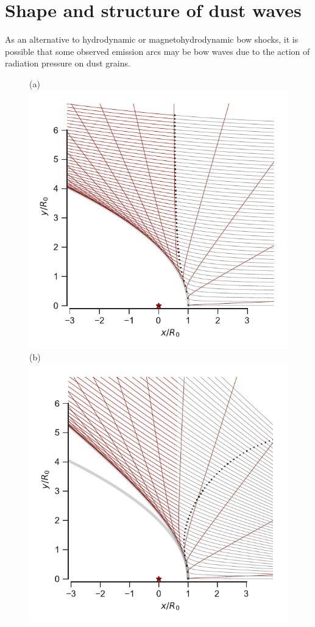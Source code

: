 
\section{Shape and structure of dust waves}
\label{sec:shape-dust-wave}

As an alternative to hydrodynamic or magnetohydrodynamic bow shocks,
it is possible that some observed emission arcs may be bow waves due
to the action of radiation pressure on dust grains.

\begin{figure}
  (a)\\
  \includegraphics[width=\linewidth]{figs/dust-trajectories}
  (b)\\
  \includegraphics[width=\linewidth]{figs/dust-divergent}

\end{figure}
